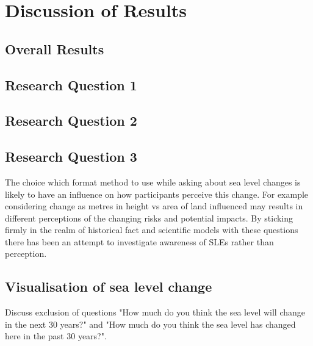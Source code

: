 
\chapter{Discussion of Results}

\section{Overall Results}

\section{Research Question 1}

\section{Research Question 2}


\section{Research Question 3}


The choice which format method to use while asking about sea level changes is likely to have an influence on how participants perceive this change. For example considering change as metres in height vs area of land influenced may results in different perceptions of the changing risks and potential impacts.  By sticking firmly in the realm of historical fact and scientific models with these questions there has been an attempt to investigate awareness of SLEs rather than perception. 

\section{Visualisation of sea level change}
Discuss exclusion of questions "How much do you think the sea level will change in the next 30 years?" and "How much do you think the sea level has changed here in the past 30 years?". 

